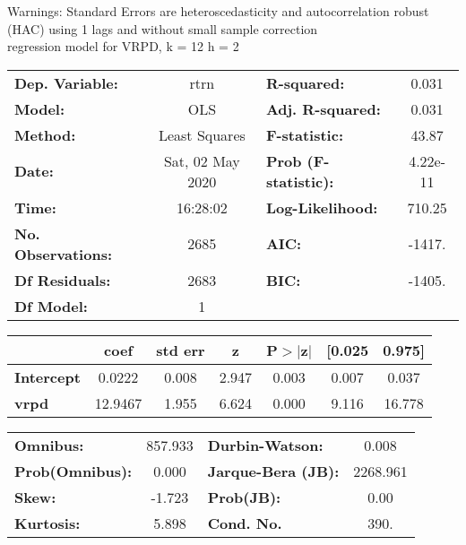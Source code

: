 Warnings: \newline
 [1] Standard Errors are heteroscedasticity and autocorrelation robust (HAC) using 1 lags and without small sample correction\\ 

regression model for VRPD, k = 12 h = 2\begin{center}
\begin{tabular}{lclc}
\toprule
\textbf{Dep. Variable:}    &       rtrn       & \textbf{  R-squared:         } &     0.031   \\
\textbf{Model:}            &       OLS        & \textbf{  Adj. R-squared:    } &     0.031   \\
\textbf{Method:}           &  Least Squares   & \textbf{  F-statistic:       } &     43.87   \\
\textbf{Date:}             & Sat, 02 May 2020 & \textbf{  Prob (F-statistic):} &  4.22e-11   \\
\textbf{Time:}             &     16:28:02     & \textbf{  Log-Likelihood:    } &    710.25   \\
\textbf{No. Observations:} &        2685      & \textbf{  AIC:               } &    -1417.   \\
\textbf{Df Residuals:}     &        2683      & \textbf{  BIC:               } &    -1405.   \\
\textbf{Df Model:}         &           1      & \textbf{                     } &             \\
\bottomrule
\end{tabular}
\begin{tabular}{lcccccc}
                   & \textbf{coef} & \textbf{std err} & \textbf{z} & \textbf{P$> |$z$|$} & \textbf{[0.025} & \textbf{0.975]}  \\
\midrule
\textbf{Intercept} &       0.0222  &        0.008     &     2.947  &         0.003        &        0.007    &        0.037     \\
\textbf{vrpd}      &      12.9467  &        1.955     &     6.624  &         0.000        &        9.116    &       16.778     \\
\bottomrule
\end{tabular}
\begin{tabular}{lclc}
\textbf{Omnibus:}       & 857.933 & \textbf{  Durbin-Watson:     } &    0.008  \\
\textbf{Prob(Omnibus):} &   0.000 & \textbf{  Jarque-Bera (JB):  } & 2268.961  \\
\textbf{Skew:}          &  -1.723 & \textbf{  Prob(JB):          } &     0.00  \\
\textbf{Kurtosis:}      &   5.898 & \textbf{  Cond. No.          } &     390.  \\
\bottomrule
\end{tabular}
\end{center}

